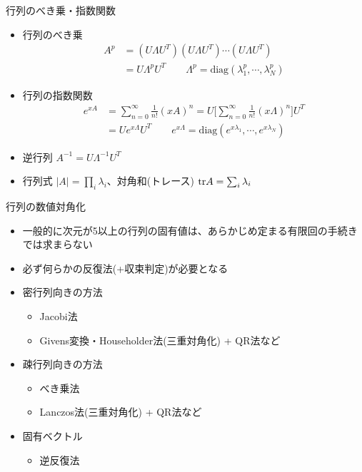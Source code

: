 \begin{frame}[t,fragile]{行列のべき乗・指数関数}
  \begin{itemize}
  \item 行列のべき乗
    \begin{align*}
      A^p &= (U \Lambda U^T)(U \Lambda U^T) \cdots (U \Lambda U^T) \\
      &= U \Lambda^p U^T \qquad \Lambda^p = \text{diag}(\lambda_1^p,\cdots,\lambda_N^p)
    \end{align*}
  \item 行列の指数関数
    \begin{align*}
      e^{xA} &= \sum_{n=0}^{\infty} \frac{1}{n!}(xA)^n = U \Big[ \sum_{n=0}^{\infty} \frac{1}{n!}(x\Lambda)^n \Big] U^T \\
      &= U e^{x \Lambda} U^T \qquad e^{x \Lambda} = \text{diag}(e^{x\lambda_1},\cdots,e^{x\lambda_N})
    \end{align*}
  \item 逆行列 $A^{-1} = U \Lambda^{-1} U^T$
  \item 行列式 $|A| = \prod_i \lambda_i$、対角和(トレース) ${\rm tr} A = \sum_i \lambda_i$
  \end{itemize}
\end{frame}

\begin{frame}[t,fragile]{行列の数値対角化}
  \begin{itemize}
  \item 一般的に次元が5以上の行列の固有値は、あらかじめ定まる有限回の手続きでは求まらない
  \item 必ず何らかの反復法(+収束判定)が必要となる
  \item 密行列向きの方法
    \begin{itemize}
    \item Jacobi法
    \item Givens変換・Householder法(三重対角化) + QR法など
    \end{itemize}
  \item 疎行列向きの方法
    \begin{itemize}
    \item べき乗法
    \item Lanczos法(三重対角化) + QR法など
    \end{itemize}
  \item 固有ベクトル
    \begin{itemize}
    \item 逆反復法
    \end{itemize}
  \end{itemize}
\end{frame}
